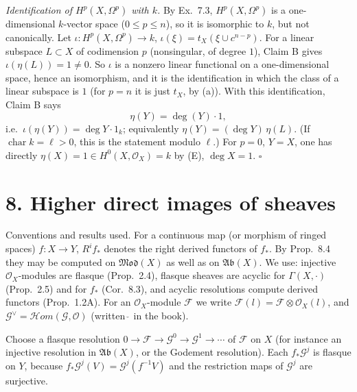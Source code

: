 \documentclass[11pt]{article}
\begin{document}
\emph{Identification of $H^p(X,\Omega^p)$ with $k$.} By Ex.~7.3, $H^p(X,\Omega^p)$ is a one-dimensional $k$-vector space ($0\le p\le n$), so it is isomorphic to $k$, but not canonically. Let $\iota\colon H^p(X,\Omega^p)\to k$, $\iota(\xi)=t_X(\xi\cup c^{n-p})$. For a linear subspace $L\subset X$ of codimension $p$ (nonsingular, of degree $1$), Claim B gives $\iota(\eta(L))=1\ne0$. So $\iota$ is a nonzero linear functional on a one-dimensional space, hence an isomorphism, and it is the identification in which the class of a linear subspace is $1$ (for $p=n$ it is just $t_X$, by (a)). With this identification, Claim B says
\[
\eta(Y)=\deg(Y)\cdot1 ,
\]
i.e.\ $\iota(\eta(Y))=\deg Y\cdot1_k$; equivalently $\eta(Y)=(\deg Y)\,\eta(L)$. (If $\operatorname{char}k=\ell>0$, this is the statement modulo $\ell$.) For $p=0$, $Y=X$, one has directly $\eta(X)=1\in H^0(X,\mathcal O_X)=k$ by (E), $\deg X=1$. \hfill$\square$

\section*{8. Higher direct images of sheaves}

Conventions and results used. For a continuous map (or morphism of ringed spaces) $f:X\to Y$, $R^if_*$ denotes the right derived functors of $f_*$. By Prop.~8.4 they may be computed on $\mathfrak{Mod}(X)$ as well as on $\mathfrak{Ab}(X)$. We use: injective $\mathcal O_X$-modules are flasque (Prop.~2.4), flasque sheaves are acyclic for $\Gamma(X,\cdot)$ (Prop.~2.5) and for $f_*$ (Cor.~8.3), and acyclic resolutions compute derived functors (Prop.~1.2A). For an $\mathcal O_X$-module $\mathcal F$ we write $\mathcal F(l)=\mathcal F\otimes\mathcal O_X(l)$, and $\mathcal G^{\vee}=\mathcal{H}om(\mathcal G,\mathcal O)$ (written $\check{\ }$ in the book).

\pf
Choose a flasque resolution $0\to\mathcal F\to\mathcal G^0\to\mathcal G^1\to\cdots$ of $\mathcal F$ on $X$ (for instance an injective resolution in $\mathfrak{Ab}(X)$, or the Godement resolution). Each $f_*\mathcal G^j$ is flasque on $Y$, because $f_*\mathcal G^j(V)=\mathcal G^j(f^{-1}V)$ and the restriction maps of $\mathcal G^j$ are surjective.
\end{document}
